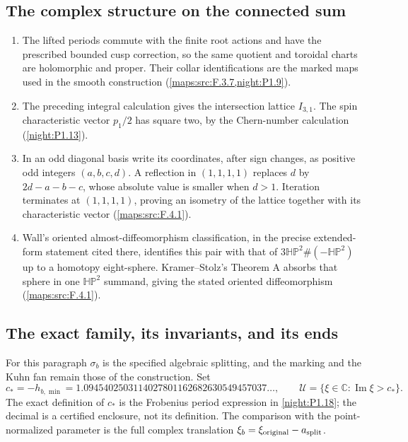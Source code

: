 \subsection{The complex structure on the connected sum}
\RungOne
\begin{enumerate}[label=\arabic*.]
\item The lifted periods commute with the finite root actions and
  have the prescribed bounded cusp correction, so the same quotient
  and toroidal charts are holomorphic and proper.  Their collar
  identifications are the marked maps used in the smooth construction
  (\cref{maps:src:F.3.7,night:P1.9}).
\item The preceding integral calculation gives the intersection
  lattice $I_{3,1}$.  The spin characteristic vector $p_1/2$ has
  square two, by the Chern-number calculation
  (\cref{night:P1.13}).
\item In an odd diagonal basis write its coordinates, after sign
  changes, as positive odd integers $(a,b,c,d)$.  A reflection in
  $(1,1,1,1)$ replaces $d$ by $2d-a-b-c$, whose absolute value is
  smaller when $d>1$.  Iteration terminates at $(1,1,1,1)$, proving
  an isometry of the lattice together with its characteristic vector
  (\cref{maps:src:F.4.1}).
\item Wall's oriented almost-diffeomorphism classification, in the
  precise extended-form statement cited there, identifies this pair
  with that of $3\mathbb{HP}^2\#(-\mathbb{HP}^2)$ up to a homotopy
  eight-sphere.  Kramer--Stolz's Theorem A absorbs that sphere in one
  $\mathbb{HP}^2$ summand, giving the stated oriented diffeomorphism
  (\cref{maps:src:F.4.1}).
\end{enumerate}

\subsection{The exact family, its invariants, and its ends}
For this paragraph $\sigma_b$ is the specified algebraic splitting,
and the marking and the Kuhn fan remain those of the construction.
Set
\[
 c_*=-h_{b,\min}=1.0945402503114027801162682630549457037\ldots,
 \qquad \mathcal U=\{\xi\in\mathbb C:\operatorname{Im}\xi>c_*\}.
\]
The exact definition of $c_*$ is the Frobenius period expression in
\cref{night:P1.18}; the decimal is a certified enclosure, not its
definition.  The comparison with the point-normalized parameter is
the full complex translation $\xi_b=\xi_{\rm original}-a_{\rm split}$.


